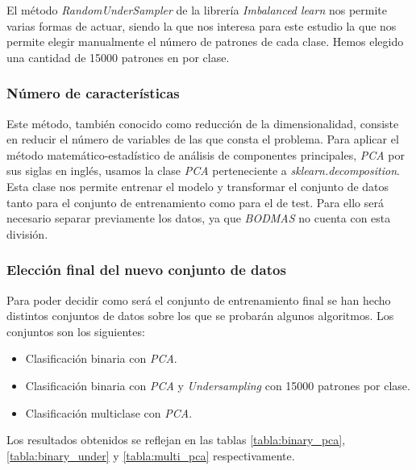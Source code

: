 \vspace{1em}

El método \textit{RandomUnderSampler} \cite{randundersampler} de la librería \textit{Imbalanced learn} nos permite varias formas de actuar, siendo la que nos interesa para este estudio la que nos permite elegir manualmente el número de patrones de cada clase. Hemos elegido una cantidad de 15000 patrones en por clase.

\subsubsection{Número de características}
\label{subsubsec:num_caract}

Este método, también conocido como reducción de la dimensionalidad, consiste en reducir el número de variables de las que consta el problema. Para aplicar el método matemático-estadístico de análisis de componentes principales, \textit{PCA} por sus siglas en inglés, usamos la clase \textit{PCA} \cite{sklearn_pca} perteneciente a \textit{sklearn.decomposition}. Esta clase nos permite entrenar el modelo y transformar el conjunto de datos tanto para el conjunto de entrenamiento como para el de test. Para ello será necesario separar previamente los datos, ya que \textit{BODMAS} no cuenta con esta división.

\subsubsection{Elección final del nuevo conjunto de datos}
\label{subsubsec:eleccion_dataset}

Para poder decidir como será el conjunto de entrenamiento final se han hecho distintos conjuntos de datos sobre los que se probarán algunos algoritmos. Los conjuntos son los siguientes:

\begin{itemize}
	\item Clasificación binaria con \textit{PCA}.
	\item Clasificación binaria con \textit{PCA} y \textit{Undersampling} con 15000 patrones por clase.
	\item Clasificación multiclase con \textit{PCA}.
\end{itemize}

Los resultados obtenidos se reflejan en las tablas \ref{tabla:binary_pca}, \ref{tabla:binary_under} y \ref{tabla:multi_pca} respectivamente.

